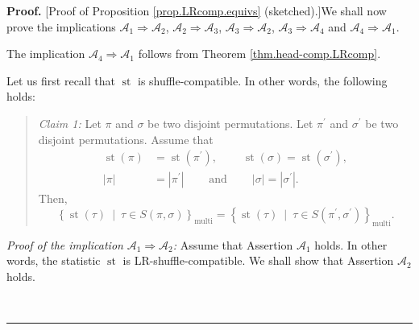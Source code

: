 \documentclass[numbers=enddot,12pt,final,onecolumn,notitlepage]{scrartcl}%
\theoremstyle{definition}
\newenvironment{statement}{\begin{quote}}{\end{quote}}
\newenvironment{proof}[1][Proof]{\noindent\textbf{#1.} }{\ \rule{0.5em}{0.5em}}
\newenvironment{noncompile}{}{}
\begin{document}
\begin{proof}
[Proof of Proposition \ref{prop.LRcomp.equivs} (sketched).]We shall now prove
the implications $\mathcal{A}_{1}\Longrightarrow\mathcal{A}_{2}$,
$\mathcal{A}_{2}\Longrightarrow\mathcal{A}_{3}$, $\mathcal{A}_{3}%
\Longrightarrow\mathcal{A}_{2}$, $\mathcal{A}_{3}\Longrightarrow
\mathcal{A}_{4}$ and $\mathcal{A}_{4}\Longrightarrow\mathcal{A}_{1}$.

The implication $\mathcal{A}_{4}\Longrightarrow\mathcal{A}_{1}$ follows from
Theorem \ref{thm.head-comp.LRcomp}.

\begin{noncompile}
Let us first recall that $\operatorname*{st}$ is shuffle-compatible. In other
words, the following holds:

\begin{statement}
\textit{Claim 1:} Let $\pi$ and $\sigma$ be two disjoint permutations. Let
$\pi^{\prime}$ and $\sigma^{\prime}$ be two disjoint permutations. Assume that%
\begin{align*}
\operatorname*{st}\left(  \pi\right)   &  =\operatorname*{st}\left(
\pi^{\prime}\right)  ,\ \ \ \ \ \ \ \ \ \ \operatorname*{st}\left(
\sigma\right)  =\operatorname*{st}\left(  \sigma^{\prime}\right)  ,\\
\left\vert \pi\right\vert  &  =\left\vert \pi^{\prime}\right\vert
\ \ \ \ \ \ \ \ \ \ \text{and}\ \ \ \ \ \ \ \ \ \ \left\vert \sigma\right\vert
=\left\vert \sigma^{\prime}\right\vert .
\end{align*}
Then,
\[
\left\{  \operatorname*{st}\left(  \tau\right)  \ \mid\ \tau\in S\left(
\pi,\sigma\right)  \right\}  _{\operatorname*{multi}}=\left\{
\operatorname*{st}\left(  \tau\right)  \ \mid\ \tau\in S\left(  \pi^{\prime
},\sigma^{\prime}\right)  \right\}  _{\operatorname*{multi}}.
\]

\end{statement}
\end{noncompile}

\textit{Proof of the implication }$\mathcal{A}_{1}\Longrightarrow
\mathcal{A}_{2}$\textit{:} Assume that Assertion $\mathcal{A}_{1}$ holds. In
other words, the statistic $\operatorname*{st}$ is LR-shuffle-compatible. We
shall show that Assertion $\mathcal{A}_{2}$ holds.


\end{proof}
\end{document}
